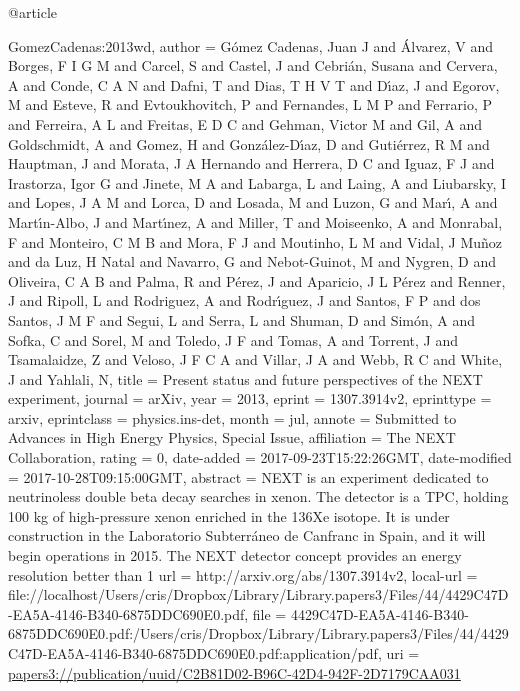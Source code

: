 @article{GomezCadenas:2013wd,
author = {G{\'o}mez Cadenas, Juan J and {\'A}lvarez, V and Borges, F I G M and Carcel, S and Castel, J and Cebri{\'a}n, Susana and Cervera, A and Conde, C A N and Dafni, T and Dias, T H V T and D{\'\i}az, J and Egorov, M and Esteve, R and Evtoukhovitch, P and Fernandes, L M P and Ferrario, P and Ferreira, A L and Freitas, E D C and Gehman, Victor M and Gil, A and Goldschmidt, A and Gomez, H and Gonz{\'a}lez-D{\'\i}az, D and Guti{\'e}rrez, R M and Hauptman, J and Morata, J A Hernando and Herrera, D C and Iguaz, F J and Irastorza, Igor G and Jinete, M A and Labarga, L and Laing, A and Liubarsky, I and Lopes, J A M and Lorca, D and Losada, M and Luzon, G and Mar{\'\i}, A and Mart{\'\i}n-Albo, J and Mart{\'\i}nez, A and Miller, T and Moiseenko, A and Monrabal, F and Monteiro, C M B and Mora, F J and Moutinho, L M and Vidal, J Mu{\~n}oz and da Luz, H Natal and Navarro, G and Nebot-Guinot, M and Nygren, D and Oliveira, C A B and Palma, R and P{\'e}rez, J and Aparicio, J L P{\'e}rez and Renner, J and Ripoll, L and Rodriguez, A and Rodr{\'\i}guez, J and Santos, F P and dos Santos, J M F and Segui, L and Serra, L and Shuman, D and Sim{\'o}n, A and Sofka, C and Sorel, M and Toledo, J F and Tomas, A and Torrent, J and Tsamalaidze, Z and Veloso, J F C A and Villar, J A and Webb, R C and White, J and Yahlali, N},
title = {{Present status and future perspectives of the NEXT experiment}},
journal = {arXiv},
year = {2013},
eprint = {1307.3914v2},
eprinttype = {arxiv},
eprintclass = {physics.ins-det},
month = jul,
annote = {Submitted to Advances in High Energy Physics, Special Issue},
affiliation = {The NEXT Collaboration},
rating = {0},
date-added = {2017-09-23T15:22:26GMT},
date-modified = {2017-10-28T09:15:00GMT},
abstract = {NEXT is an experiment dedicated to neutrinoless double beta decay searches in xenon. The detector is a TPC, holding 100 kg of high-pressure xenon enriched in the 136Xe isotope. It is under construction in the Laboratorio Subterr\'aneo de Canfranc in Spain, and it will begin operations in 2015. The NEXT detector concept provides an energy resolution better than 1%
url = {http://arxiv.org/abs/1307.3914v2},
local-url = {file://localhost/Users/cris/Dropbox/Library/Library.papers3/Files/44/4429C47D-EA5A-4146-B340-6875DDC690E0.pdf},
file = {{4429C47D-EA5A-4146-B340-6875DDC690E0.pdf:/Users/cris/Dropbox/Library/Library.papers3/Files/44/4429C47D-EA5A-4146-B340-6875DDC690E0.pdf:application/pdf}},
uri = {\url{papers3://publication/uuid/C2B81D02-B96C-42D4-942F-2D7179CAA031}}
}

}
